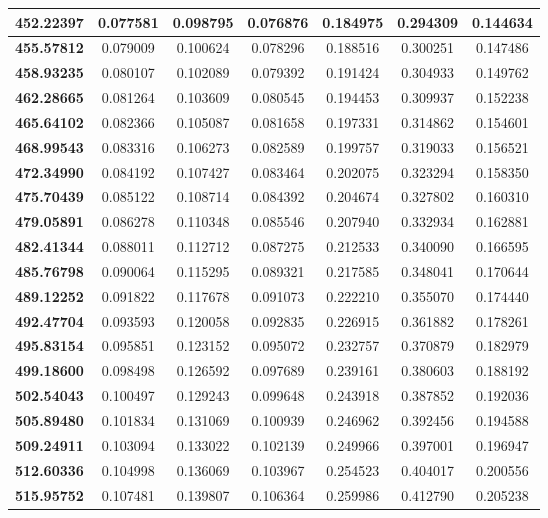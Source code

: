 \documentclass[11pt]{article}
\begin{document}
\begin{appendices}
\begin{longtable}{|c|c|c|c|c|c|c|}
	\textbf{452.22397} & 0.077581 & 0.098795 & 0.076876 & 0.184975 & 0.294309 & 0.144634 \\ \hline
	\textbf{455.57812} & 0.079009 & 0.100624 & 0.078296 & 0.188516 & 0.300251 & 0.147486 \\ \hline
	\textbf{458.93235} & 0.080107 & 0.102089 & 0.079392 & 0.191424 & 0.304933 & 0.149762 \\ \hline
	\textbf{462.28665} & 0.081264 & 0.103609 & 0.080545 & 0.194453 & 0.309937 & 0.152238 \\ \hline
	\textbf{465.64102} & 0.082366 & 0.105087 & 0.081658 & 0.197331 & 0.314862 & 0.154601 \\ \hline
	\textbf{468.99543} & 0.083316 & 0.106273 & 0.082589 & 0.199757 & 0.319033 & 0.156521 \\ \hline
	\textbf{472.34990} & 0.084192 & 0.107427 & 0.083464 & 0.202075 & 0.323294 & 0.158350 \\ \hline
	\textbf{475.70439} & 0.085122 & 0.108714 & 0.084392 & 0.204674 & 0.327802 & 0.160310 \\ \hline
	\textbf{479.05891} & 0.086278 & 0.110348 & 0.085546 & 0.207940 & 0.332934 & 0.162881 \\ \hline
	\textbf{482.41344} & 0.088011 & 0.112712 & 0.087275 & 0.212533 & 0.340090 & 0.166595 \\ \hline
	\textbf{485.76798} & 0.090064 & 0.115295 & 0.089321 & 0.217585 & 0.348041 & 0.170644 \\ \hline
	\textbf{489.12252} & 0.091822 & 0.117678 & 0.091073 & 0.222210 & 0.355070 & 0.174440 \\ \hline
	\textbf{492.47704} & 0.093593 & 0.120058 & 0.092835 & 0.226915 & 0.361882 & 0.178261 \\ \hline
	\textbf{495.83154} & 0.095851 & 0.123152 & 0.095072 & 0.232757 & 0.370879 & 0.182979 \\ \hline
	\textbf{499.18600} & 0.098498 & 0.126592 & 0.097689 & 0.239161 & 0.380603 & 0.188192 \\ \hline
	\textbf{502.54043} & 0.100497 & 0.129243 & 0.099648 & 0.243918 & 0.387852 & 0.192036 \\ \hline
	\textbf{505.89480} & 0.101834 & 0.131069 & 0.100939 & 0.246962 & 0.392456 & 0.194588 \\ \hline
	\textbf{509.24911} & 0.103094 & 0.133022 & 0.102139 & 0.249966 & 0.397001 & 0.196947 \\ \hline
	\textbf{512.60336} & 0.104998 & 0.136069 & 0.103967 & 0.254523 & 0.404017 & 0.200556 \\ \hline
	\textbf{515.95752} & 0.107481 & 0.139807 & 0.106364 & 0.259986 & 0.412790 & 0.205238 \\ \hline

\end{longtable}
\end{appendices}
\end{document}
